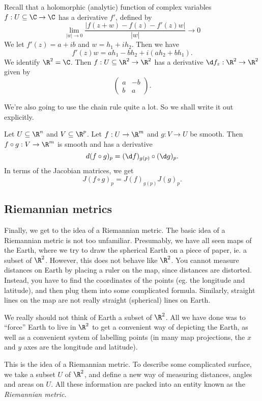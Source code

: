 \documentclass[a4paper]{article}
\begin{document}
\begin{eg}
  Recall that a holomorphic (analytic) function of complex variables $f: U \subseteq \C \to \C$ has a derivative $f'$, defined by
  \[
    \lim_{|w| \to 0} \frac{|f(z + w) - f(z) - f'(z) w|}{|w|} \to 0
  \]
  We let $f'(z) = a + ib$ and $w = h_1 + i h_2$. Then we have
  \[
    f'(z) w = ah_1 - bh_2 + i(ah_2 + bh_1).
  \]
  We identify $\R^2 = \C$. Then $f: U \subseteq \R^2 \to \R^2$ has a derivative $\d f_z: \R^2 \to \R^2$ given by
  \[
    \begin{pmatrix}
      a & -b\\
      b & a
    \end{pmatrix}.
  \]
\end{eg}

We're also going to use the chain rule quite a lot. So we shall write it out explicitly.
\begin{prop}
  Let $U \subseteq \R^n$ and $V\subseteq \R^p$. Let $f: U \to \R^m$ and $g: V \to U$ be smooth. Then $f \circ g: V \to \R^m$ is smooth and has a derivative
  \[
    d(f \circ g)_p = (\d f)_{g(p)} \circ (\d g)_p.
  \]
  In terms of the Jacobian matrices, we get
  \[
    J(f \circ g)_p = J(f)_{g(p)}J(g)_p.
  \]
\end{prop}

\subsection{Riemannian metrics}
Finally, we get to the idea of a Riemannian metric. The basic idea of a Riemannian metric is not too unfamiliar. Presumably, we have all seen maps of the Earth, where we try to draw the spherical Earth on a piece of paper, ie. a subset of $\R^2$. However, this does not behave like $\R^2$. You cannot measure distances on Earth by placing a ruler on the map, since distances are distorted. Instead, you have to find the coordinates of the points (eg. the longitude and latitude), and then plug them into some complicated formula. Similarly, straight lines on the map are not really straight (spherical) lines on Earth.

We really should not think of Earth a subset of $\R^2$. All we have done was to ``force'' Earth to live in $\R^2$ to get a convenient way of depicting the Earth, as well as a convenient system of labelling points (in many map projections, the $x$ and $y$ axes are the longitude and latitude).

This is the idea of a Riemannian metric. To describe some complicated surface, we take a subset $U$ of $\R^2$, and define a new way of measuring distances, angles and areas on $U$. All these information are packed into an entity known as the \emph{Riemannian metric}.
\end{document}
